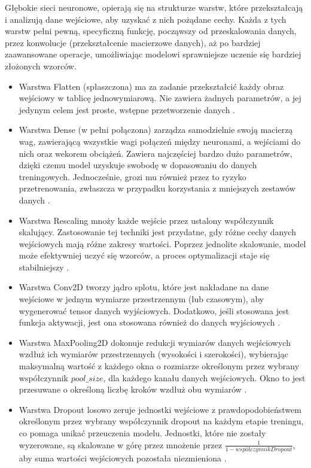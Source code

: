 Głębokie sieci neuronowe, opierają się na strukturze warstw,
które przekształcają i analizują dane wejściowe, aby uzyskać z nich pożądane cechy.
Każda z tych warstw pełni pewną, specyficzną funkcję, począwszy od przeskalowania danych,
przez konwolucje (przekształcenie macierzowe danych),
aż po bardziej zaawansowane operacje, umożliwiając modelowi sprawniejsze uczenie się bardziej złożonych wzorców.
\begin{itemize}[label=-,labelsep=0.4cm,leftmargin=0.6cm]   
	\item Warstwa Flatten (spłaszczona) ma za zadanie przekształcić każdy obraz wejściowy w tablicę jednowymiarową.
		Nie zawiera żadnych parametrów, a jej jedynym celem jest proste, wstępne przetworzenie danych \cite{Geron2020}.
	\item Warstwa Dense (w pełni połączona) zarządza samodzielnie swoją macierzą wag,
		zawierającą wszystkie wagi połączeń między neuronami, a wejściami do nich oraz wekorem obciążeń.
		Zawiera najczęściej bardzo dużo parametrów, dzięki czemu model uzyskuje swobodę w dopasowaniu do danych treningowych.
		Jednocześnie, grozi mu również przez to ryzyko przetrenowania,
		zwłaszcza w przypadku korzystania z mniejszych zestawów danych \cite{Geron2020}.
    \item Warstwa Rescaling mnoży każde wejście przez ustalony współczynnik skalujący.
		Zastosowanie tej techniki jest przydatne, gdy różne cechy danych wejściowych mają różne zakresy wartości.
		Poprzez jednolite skalowanie, model może efektywniej uczyć się wzorców, a proces optymalizacji staje się stabilniejszy \cite{Fenner2020}.
	\item Warstwa Conv2D tworzy jądro splotu, które jest nakładane na dane wejściowe w jednym wymiarze przestrzennym (lub czasowym), 
		aby wygenerować tensor danych wyjściowych.
		Dodatkowo, jeśli stosowana jest funkcja aktywacji, jest ona stosowana również do danych wyjściowych \cite{Geron2020}.
	\item Warstwa MaxPooling2D dokonuje redukcji wymiarów danych wejściowych wzdłuż ich wymiarów przestrzennych (wysokości i szerokości),
		wybierając maksymalną wartość z każdego okna o rozmiarze określonym przez wybrany współczynnik $pool\_size$,
		dla każdego kanału danych wejściowych.
		Okno to jest przesuwane o określoną liczbę kroków wzdłuż obu wymiarów \cite{Geron2020}.
	\item Warstwa Dropout losowo zeruje jednostki wejściowe z prawdopodobieństwem określonym
		przez wybrany współczynnik dropout na każdym etapie treningu, co pomaga unikać przeuczenia modelu.
		Jednostki, które nie zostały wyzerowane, są skalowane w górę przez mnożenie przez $\frac{1}{1 - współczynnikDropout}$,
		aby suma wartości wejściowych pozostała niezmieniona \cite{Geron2020}.
\end{itemize}